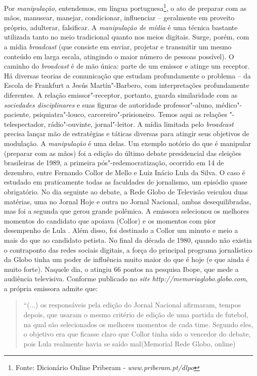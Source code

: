 Por \emph{manipulação}, entendemos, em língua portuguesa\footnote{Fonte:
  Dicionário Online Priberam -
  \emph{www.priberam.pt/dlpo}}, o
ato de preparar com as mãos, manusear, manejar, condicionar, influenciar
-- geralmente em proveito próprio, adulterar, falsificar. A
\emph{manipulação de mídia} é uma técnica bastante utilizada tanto no
meio tradicional quanto nos meios digitais. Surge, porém, com a mídia
\emph{broadcast} (que consiste em enviar, projetar e transmitir um mesmo
conteúdo em larga escala, atingindo o maior número de pessoas possível).
O caminho do \emph{broadcast} é de mão única: parte de um emissor e
atinge um receptor. Há diversas teorias de comunicação que estudam
profundamente o problema -- da Escola de Frankfurt a Jesús
Martín"-Barbero, com interpretações profundamente diferentes. A relação
emissor"-receptor, portanto, guarda similaridade com as \emph{sociedades
disciplinares} e suas figuras de autoridade professor"-aluno,
médico"-paciente, psiquiatra"-louco, carcereiro"-prisioneiro. Temos aqui as
relações "-telespectador, rádio"-ouvinte, jornal"-leitor. A mídia
limitada pelo \emph{broadcast} precisa lançar mão de estratégias e
táticas diversas para atingir seus objetivos de modulação. A
\emph{manipulação} é uma delas. Um exemplo notório do que é manipular
(preparar com as mãos) foi a edição do último debate presidencial das
eleições brasileiras de 1989, a primeira pós"-redemocratização, ocorrido
em 14 de dezembro, entre Fernando Collor de Mello e Luiz Inácio Lula da
Silva. O caso é estudado em praticamente todas as faculdades de
jornalismo, um episódio quase obrigatório. No dia seguinte ao debate, a
Rede Globo de Televisão veiculou duas matérias, uma no Jornal Hoje e
outra no Jornal Nacional, ambas desequilibradas, mas foi a segunda que
gerou grande polêmica. A emissora selecionou os melhores momentos do
candidato que apoiava (Collor) e os momentos com pior desempenho de Lula
. Além disso, foi destinado a Collor um minuto e meio a mais do que ao
candidato petista. No final da década de 1980, quando não existia o
contraponto das redes sociais digitais, a força do principal programa
jornalístico da Globo tinha um poder de influência muito maior do que é
hoje (e que ainda é muito forte). Naquele dia, o  atingiu 66 pontos na
pesquisa Ibope, que mede a audiência televisiva. Conforme publicado no
\emph{site} \emph{http://memoriaglobo.globo.com}, a própria emissora admite que:

\begin{quote}
``(...) os responsáveis pela edição do Jornal Nacional afirmaram, tempos
depois, que usaram o mesmo critério de edição de uma partida de futebol,
na qual são selecionados os melhores momentos de cada time. Segundo
eles, o objetivo era que ficasse claro que Collor tinha sido o vencedor
do debate, pois Lula realmente havia se saído mal(Memorial Rede Globo,
online)
\end{quote}

